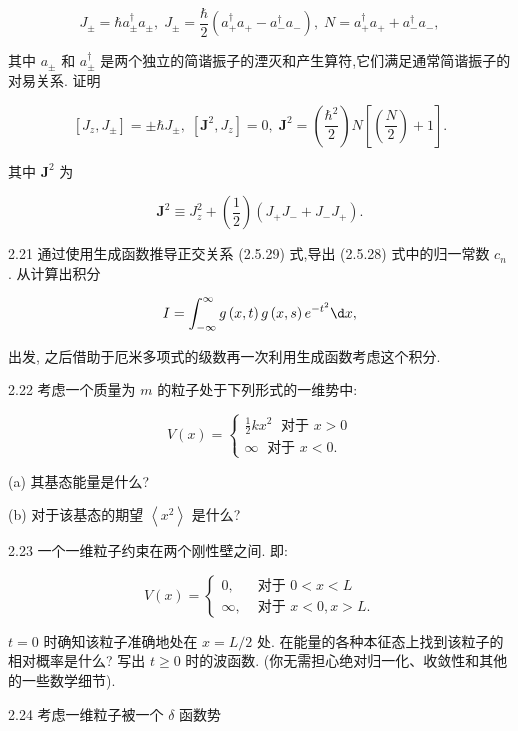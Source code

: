 \documentclass[lang=cn,newtx,10pt,scheme=chinese,thmcnt=section]{elegantbook}
\begin{document}
$$
{J}_{ \pm } = \hbar {a}_{ \pm }^{ \dagger }{a}_{ \pm },\;{J}_{ \pm } = \frac{\hbar }{2}\left( {{a}_{ + }^{ \dagger }{a}_{ + } - {a}_{ - }^{ \dagger }{a}_{ - }}\right) ,\;N = {a}_{ + }^{ \dagger }{a}_{ + } + {a}_{ - }^{ \dagger }{a}_{ - },
$$

其中 ${a}_{ \pm }$ 和 ${a}_{ \pm }^{ \dagger }$ 是两个独立的简谐振子的湮灭和产生算符,它们满足通常简谐振子的对易关系. 证明

$$
\left\lbrack {{J}_{z},{J}_{ \pm }}\right\rbrack = \pm \hbar {J}_{ \pm },\;\left\lbrack {{\mathbf{J}}^{2},{J}_{z}}\right\rbrack = 0,\;{\mathbf{J}}^{2} = \left( \frac{{\hbar }^{2}}{2}\right) N\left\lbrack {\left( \frac{N}{2}\right) + 1}\right\rbrack .
$$

其中 ${\mathbf{J}}^{2}$ 为

$$
{\mathbf{J}}^{2} \equiv {J}_{z}^{2} + \left( \frac{1}{2}\right) \left( {{J}_{ + }{J}_{ - } + {J}_{ - }{J}_{ + }}\right) .
$$

2.21 通过使用生成函数推导正交关系 (2.5.29) 式,导出 (2.5.28) 式中的归一常数 ${c}_{n}$ . 从计算出积分

$$
I = \int_{-\infty }^{\infty }g\left( {x, t}\right) g\left( {x, s}\right) {e}^{-{t}^{2}}{\d x},
$$

出发, 之后借助于厄米多项式的级数再一次利用生成函数考虑这个积分.

2.22 考虑一个质量为 $m$ 的粒子处于下列形式的一维势中:

$$
V\left( x\right) = \left\{ \begin{array}{l} \frac{1}{2}k{x}^{2}\;\text{ 对于 }x > 0 \\ \infty \;\text{ 对于 }x < 0. \end{array}\right.
$$

(a) 其基态能量是什么?

(b) 对于该基态的期望 $\left\langle {x}^{2}\right\rangle$ 是什么?

2.23 一个一维粒子约束在两个刚性壁之间. 即:

$$
V\left( x\right) = \left\{ \begin{array}{ll} 0, & \text{ 对于 }0 < x < L \\ \infty , & \text{ 对于 }x < 0, x > L. \end{array}\right.
$$

$t = 0$ 时确知该粒子准确地处在 $x = L/2$ 处. 在能量的各种本征态上找到该粒子的相对概率是什么? 写出 $t \geq 0$ 时的波函数. (你无需担心绝对归一化、收敛性和其他的一些数学细节).

2.24 考虑一维粒子被一个 $\delta$ 函数势
\end{document}
